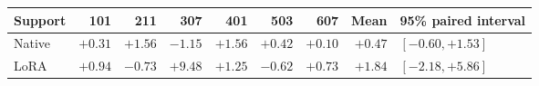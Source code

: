 \begin{tabular}{@{}lrrrrrrrl@{}}
\toprule
Support & 101 & 211 & 307 & 401 & 503 & 607 & Mean & 95\% paired interval\\
\midrule
Native & $+0.31$ & $+1.56$ & $-1.15$ & $+1.56$ & $+0.42$ & $+0.10$ & $+0.47$ & $[-0.60,+1.53]$\\
LoRA & $+0.94$ & $-0.73$ & $+9.48$ & $+1.25$ & $-0.62$ & $+0.73$ & $+1.84$ & $[-2.18,+5.86]$\\
\bottomrule
\end{tabular}
